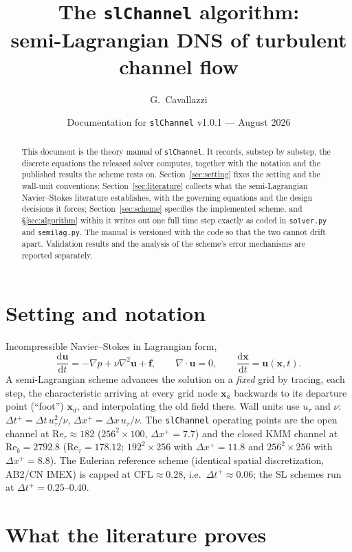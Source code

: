 \documentclass[11pt,a4paper]{article}
\title{The \texttt{slChannel} algorithm:\\
semi-Lagrangian DNS of turbulent channel flow}
\author{G.~Cavallazzi}
\date{Documentation for \texttt{slChannel} v1.0.1 --- August 2026}
\newcommand{\ut}{u_\tau}
\newcommand{\Ret}{\mathrm{Re}_\tau}
\newcommand{\Reb}{\mathrm{Re}_b}
\newcommand{\dtp}{\Delta t^{+}}
\newcommand{\bu}{\mathbf{u}}
\newcommand{\bx}{\mathbf{x}}
\newcommand{\dd}{\mathrm{d}}
\begin{document}
\maketitle

\begin{abstract}
\noindent
This document is the theory manual of \texttt{slChannel}. It records, substep
by substep, the discrete equations the released solver computes, together
with the notation and the published results the scheme rests on.
Section~\ref{sec:setting} fixes the setting and the wall-unit conventions;
Section~\ref{sec:literature} collects what the semi-Lagrangian
Navier--Stokes literature establishes, with the governing equations and the
design decisions it forces; Section~\ref{sec:scheme} specifies the
implemented scheme, and \S\ref{sec:algorithm} within it writes out one full
time step exactly as coded in \texttt{solver.py} and \texttt{semilag.py}.
The manual is versioned with the code so that the two cannot drift apart.
Validation results and the analysis of the scheme's error mechanisms are
reported separately.
\end{abstract}
\section{Setting and notation}
\label{sec:setting}

Incompressible Navier--Stokes in Lagrangian form,
\begin{equation}
\frac{\dd\bu}{\dd t} = -\nabla p + \nu\nabla^2\bu + \mathbf{f},
\qquad \nabla\cdot\bu = 0,
\qquad
\frac{\dd\bx}{\dd t} = \bu(\bx,t).
\label{eq:ns}
\end{equation}
A semi-Lagrangian scheme advances the solution on a \emph{fixed} grid by
tracing, each step, the characteristic arriving at every grid node $\bx_a$
backwards to its departure point (``foot'') $\bx_d$, and interpolating the old
field there. Wall units use $\ut$ and $\nu$:
$\dtp = \Delta t\,\ut^2/\nu$, $\Delta x^{+}=\Delta x\,\ut/\nu$. The
\texttt{slChannel} operating points are the open channel at
$\Ret\approx182$ ($256^2\times100$, $\Delta x^{+}=7.7$) and the closed
KMM \cite{kmm87} channel at $\Reb=2792.8$
($\Ret=178.12$; $192^2\times256$ with $\Delta x^{+}=11.8$ and
$256^2\times256$ with $\Delta x^{+}=8.8$). The Eulerian reference scheme
(identical spatial discretization, AB2/CN IMEX) is capped at
$\mathrm{CFL}\approx0.28$, i.e.\ $\dtp\approx0.06$; the SL schemes run at
$\dtp=0.25$--$0.40$.

\section{What the literature proves}
\label{sec:literature}
\end{document}
